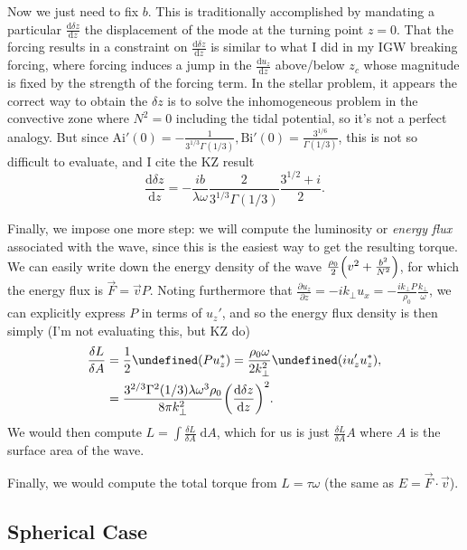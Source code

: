 \documentclass[11pt,
        usenames, %
        dvipsnames %
    ]{article}
\newcommand*{\rd}[2]{\frac{\mathrm{d}#1}{\mathrm{d}#2}}
\newcommand*{\pd}[2]{\frac{\partial#1}{\partial#2}}
\let\Re\undefined
\DeclareMathOperator{\Re}{Re}
\DeclarePairedDelimiter\p{\lparen}{\rparen}
\begin{document}
Now we just need to fix $b$. This is traditionally accomplished by mandating a
particular $\rd{\delta z}{z}$ the displacement of the mode at the turning point
$z = 0$. That the forcing results in a constraint on $\rd{\delta z}{z}$ is
similar to what I did in my IGW breaking forcing, where forcing induces a jump
in the $\rd{u_z}{z}$ above/below $z_c$ whose magnitude is fixed by the strength
of the forcing term. In the stellar problem, it appears the correct way to
obtain the $\delta z$ is to solve the inhomogeneous problem in the convective
zone where $N^2 = 0$ including the tidal potential, so it's not a perfect
analogy. But since $\mathrm{Ai}'(0) = -\frac{1}{3^{1/3}\Gamma(1/3)},
\mathrm{Bi}'(0) = \frac{3^{1/6}}{\Gamma(1/3)}$, this is not so difficult to
evaluate, and I cite the KZ result
\begin{equation}
    \rd{\delta z}{z} = -\frac{ib}{\lambda \omega}\frac{2}{3^{1/3}\Gamma(1/3)}
        \frac{3^{1/2} + i}{2}.
\end{equation}

Finally, we impose one more step: we will compute the luminosity or \emph{energy
flux} associated with the wave, since this is the easiest way to get the
resulting torque. We can easily write down the energy density of the wave
$\frac{\rho_0}{2}\p*{v^2 + \frac{b^2}{N^2}}$, for which the energy flux is
$\vec{F} = \vec{v}P$. Noting furthermore that $\pd{u_z}{z} = -ik_\perp u_x =
-\frac{ik_\perp P}{\rho_0}\frac{k_\perp }{\omega}$, we can explicitly express
$P$ in terms of $u_z'$, and so the energy flux density is then simply (I'm not
evaluating this, but KZ do)
\begin{align}
    \frac{\delta L}{\delta A} &= \frac{1}{2}\Re\p*{P u_z^*}
            = \frac{\rho_0 \omega}{2k_\perp^2} \Re\p*{iu_z'u_z^*},\\
        &= \frac{3^{2/3}\Gamma^2(1/3) \lambda \omega^3 \rho_0}{8\pi k_\perp^2}
            \p*{\rd{\delta z}{z}}^2.
\end{align}
We would then compute $L = \int \frac{\delta L}{\delta A}\;\mathrm{d}A$, which
for us is just $\frac{\delta L}{\delta A}A$ where $A$ is the surface area of the
wave.

Finally, we would compute the total torque from $L = \tau \omega$ (the same
as $E = \vec{F} \cdot \vec{v}$).

\subsection{Spherical Case}
\end{document}
